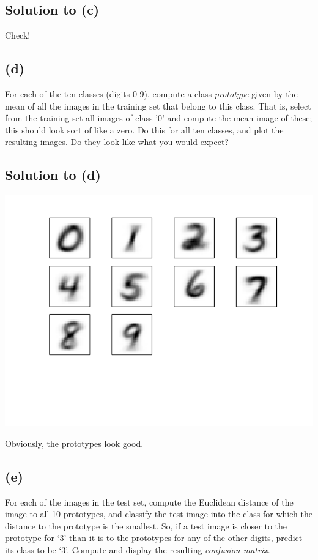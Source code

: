 \documentclass[10pt]{article}
\begin{document}
\subsection*{Solution to (c)}
Check!

\subsection*{(d)}
\color{blue}
For each of the ten classes (digits 0-9), compute a class \textit{prototype} given by the mean of all the images in the training set that belong to this class. That is, select from the training set all images of class '0' and compute the mean image of these; this should look sort of like a zero. Do this for all ten classes, and plot the resulting images. Do they look like what you would expect?
\color{black}

\subsection*{Solution to (d)}
\begin{center}
\includegraphics[scale=0.5]{MNISTPrototypes}
\end{center}
Obviously, the prototypes look good.

\subsection*{(e)}
\color{blue}
For each of the images in the test set, compute the Euclidean distance of the image to all 10 prototypes, and classify the test image into the class for which the distance to the prototype is the smallest.  So, if a test image is closer to the prototype for `3' than it is to the prototypes for any of the other digits, predict its class to be `3'.  Compute and display the resulting
\textit{confusion matrix}.
\color{black}
\end{document}
